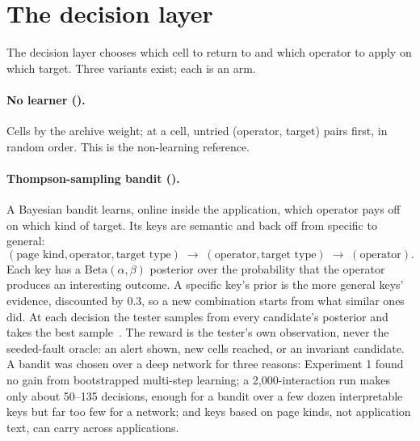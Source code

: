 \section{The decision layer}
\label{sec:decision}

The decision layer chooses which cell to return to and which operator to apply on which
target. Three variants exist; each is an arm.

\paragraph{No learner ().} Cells by the archive weight; at a cell,
untried (operator, target) pairs first, in random order. This is the non-learning
reference.

\paragraph{Thompson-sampling bandit ().} A Bayesian bandit learns,
online inside the application, which operator pays off on which kind of target. Its keys
are semantic and back off from specific to general:
\[
  (\text{page kind}, \text{operator}, \text{target type}) \;\rightarrow\;
  (\text{operator}, \text{target type}) \;\rightarrow\; (\text{operator}).
\]
Each key has a $\mathrm{Beta}(\alpha, \beta)$ posterior over the probability that the
operator produces an interesting outcome. A specific key's prior is the more general keys'
evidence, discounted by 0.3, so a new combination starts from what similar ones did. At each
decision the tester samples from every candidate's posterior and takes the best
sample~\cite{russo2018tutorial}. The reward is the tester's own
observation, never the seeded-fault oracle: an alert shown, new cells reached, or an
invariant candidate. A bandit was chosen over a deep network for three reasons:
Experiment 1 found no gain from bootstrapped multi-step learning; a 2{,}000-interaction run
makes only about 50--135 decisions, enough for a bandit over a few dozen interpretable keys
but far too few for a network; and keys based on page kinds, not application text, can carry
across applications.


